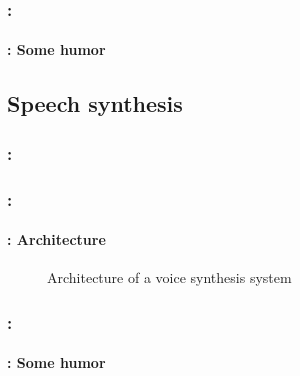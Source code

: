 \documentclass[xcolor=table]{beamer}
\begin{document}
\begin{frame}
	\frametitle{\insertshortsubtitle: \insertsection}
	\framesubtitle{\insertsubsection: Some humor}
	
		\begin{center}
		\end{center}
	
\end{frame}

\subsection{Speech synthesis}

\begin{frame}
	\frametitle{\insertshortsubtitle: \insertsection}
	\framesubtitle{\insertsubsection}
	
	
\end{frame}

\begin{frame}
	\frametitle{\insertshortsubtitle: \insertsection}
	\framesubtitle{\insertsubsection: Architecture}
	
	\begin{figure}
		\centering
		\caption{Architecture of a voice synthesis system \cite{2017-Hinterleitner}}
	\end{figure}

\end{frame}


\begin{frame}
	\frametitle{\insertshortsubtitle: \insertsection}
	\framesubtitle{\insertsubsection: Some humor}
	
	\begin{center}
	\end{center}

\end{frame}


\end{document}
